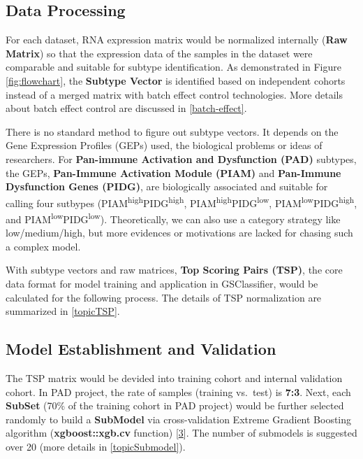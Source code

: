 \documentclass[
  12pt,
]{book}
\begin{document}
\hypertarget{data-processing}{%
\subsection{Data Processing}\label{data-processing}}

For each dataset, RNA expression matrix would be normalized internally (\textbf{Raw Matrix}) so that the expression data of the samples in the dataset were comparable and suitable for subtype identification. As demonstrated in Figure \ref{fig:flowchart}, the \textbf{Subtype Vector} is identified based on independent cohorts instead of a merged matrix with batch effect control technologies. More details about batch effect control are discussed in \ref{batch-effect}.

There is no standard method to figure out subtype vectors. It depends on the Gene Expression Profiles (GEPs) used, the biological problems or ideas of researchers. For \textbf{Pan-immune Activation and Dysfunction (PAD)} subtypes, the GEPs, \textbf{Pan-Immune Activation Module (PIAM)} and \textbf{Pan-Immune Dysfunction Genes (PIDG)}, are biologically associated and suitable for calling four sutbypes (PIAM\textsuperscript{high}PIDG\textsuperscript{high}, PIAM\textsuperscript{high}PIDG\textsuperscript{low}, PIAM\textsuperscript{low}PIDG\textsuperscript{high}, and PIAM\textsuperscript{low}PIDG\textsuperscript{low}). Theoretically, we can also use a category strategy like low/medium/high, but more evidences or motivations are lacked for chasing such a complex model.

With subtype vectors and raw matrices, \textbf{Top Scoring Pairs (TSP)}, the core data format for model training and application in GSClassifier, would be calculated for the following process. The details of TSP normalization are summarized in \ref{topicTSP}.

\hypertarget{model-establishment-and-validation}{%
\subsection{Model Establishment and Validation}\label{model-establishment-and-validation}}

The TSP matrix would be devided into training cohort and internal validation cohort. In PAD project, the rate of samples (training vs.~test) is \textbf{7:3}. Next, each \textbf{SubSet} (70\% of the training cohort in PAD project) would be further selected randomly to build a \textbf{SubModel} via cross-validation Extreme Gradient Boosting algorithm (\textbf{xgboost::xgb.cv} function) {[}\protect\hyperlink{ref-RN345}{3}{]}. The number of submodels is suggested over 20 (more details in \ref{topicSubmodel}).
\end{document}
